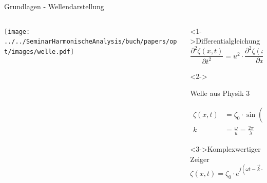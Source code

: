 \begin{frame}{Grundlagen - Wellendarstellung}
    \begin{columns}
        \begin{column}{0.5\textwidth}
            \begin{center}
                \texttt{[image: ../../SeminarHarmonischeAnalysis/buch/papers/opt/images/welle.pdf]}
            \end{center}
        \end{column}
        \begin{column}{0.5\textwidth}
            \begin{block}<1->{Differentialgleichung}
                \begin{equation*}
                    \frac{\partial^2\zeta(x, t)}{\partial t^2}
                    =
                    u^2 \cdot \frac{\partial^2\zeta(x, t)}{\partial x^2}
                \end{equation*}
            \end{block}
            \begin{block}<2->{\strut Welle aus Physik 3 \cite{opt:HSR:Physik2}}
                \begin{align*}
                    \zeta(x, t)
                    &=
                    \zeta_0 \cdot \sin(\omega t - \vec{k}\cdot\vec{x})
                    \\
                    k
                    &=
                    \frac{\omega}{u}
                    =
                    \frac{2 \pi}{\lambda}
                \end{align*}
            \end{block}
            \begin{exampleblock}<3->{Komplexwertiger Zeiger}
                \begin{equation*}
                    \zeta(x, t)
                    =
                    \zeta_0 \cdot e^{j(\omega t - \vec{k}\cdot\vec{x})}      
                \end{equation*}
            \end{exampleblock}
        \end{column}
    \end{columns}
\end{frame}

